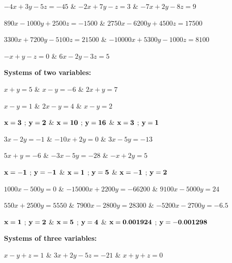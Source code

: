  \columns
\+ $-4x + 3y - 5z = -45$  &
$-2x + 7y - z = 3$  &
$-7x + 2y - 8z = 9$ \cr

\vskip 20pt

 \columns
\+ $890x - 1000y + 2500z = -1500$  &
$2750x - 6200y + 4500z = 17500$ \cr

 \columns
\+ $3300x + 7200y - 5100z = 21500$  &
$-10000x + 5300y - 1000z = 8100$ \cr

 \columns
\+ $-x + y - z = 0$  &
$6x - 2y - 3z = 5$ \cr

\vskip 10pt







\noindent
{\bf Systems of two variables:}

\vskip 5pt

 \columns
\+ $x + y = 5$  &
$x - y = -6$  &
$2x + y = 7$ \cr

 \columns
\+ $x - y = 1$  &
$2x - y = 4$  &
$x - y = 2$ \cr

 \columns
\+ ${\bf x = 3}$ ; ${\bf y = 2}$  &
${\bf x = 10}$ ; ${\bf y = 16}$  &
${\bf x = 3}$ ; ${\bf y = 1}$ \cr

\vskip 20pt

 \columns
\+ $3x - 2y = -1$  &
$-10x + 2y = 0$  &
$3x - 5y = -13$ \cr

 \columns
\+ $5x + y = -6$  &
$-3x - 5y = -28$  &
$-x + 2y = 5$ \cr

 \columns
\+ ${\bf x = -1}$ ; ${\bf y = -1}$  &
${\bf x = 1}$ ; ${\bf y = 5}$  &
${\bf x = -1}$ ; ${\bf y = 2}$ \cr

\vskip 20pt

 \columns
\+ $1000x - 500y = 0$  &
$-15000x + 2200y = -66200$  &
$9100x - 5000y = 24$ \cr

 \columns
\+ $550x + 2500y = 5550$  &
$7900x - 2800y = 28300$  &
$-5200x - 2700y = -6.5$ \cr

 \columns
\+ ${\bf x = 1}$ ; ${\bf y = 2}$  &
${\bf x = 5}$ ; ${\bf y = 4}$  &
${\bf x = 0.001924}$ ; ${\bf y = -0.001298}$ \cr

\vskip 20pt

\noindent
{\bf Systems of three variables:}

\vskip 5pt

 \columns
\+ $x - y + z = 1$  &
$3x + 2y - 5z = -21$  &
$x + y + z = 0$ \cr

